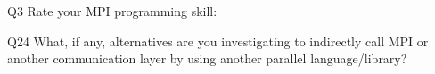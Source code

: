 \begin{description}%
\item{Q3} Rate your MPI programming skill:%
\item{Q24} What, if any, alternatives are you investigating to indirectly call MPI or another communication layer by using another parallel language/library?%
\end{description}%
